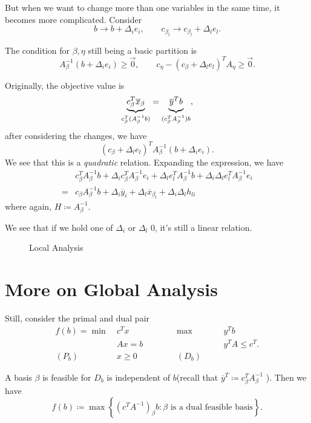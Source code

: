 But when we want to change more than one variables in the same time, it becomes more complicated. Consider
\[
	b\to b+\Delta_{i}e_{i}, \qquad c_{\beta_l}\to c_{\beta_l} + \Delta_l e_l.
\]

The condition for \(\beta, \eta\) still being a basic partition is
\[
	A_{\beta}^{-1}(b+\Delta_{i}e_{i})\geq \vec{0}, \qquad c_{\eta} - (c_{\beta}+\Delta_l e_l)^{T}A_{\eta}\geq \vec{0}.
\]

Originally, the objective value is
\[
	\underbrace{c_{\beta}^{T} \overline{x}_{\beta}}_{c_{\beta}^{T}(A^{-1}_{\beta}b)} = \underbrace{\vphantom{c_{\beta}^{T}}\overline{y}^{T}b}_{(c_{\beta}^{T}A^{-1}_{\beta})b},
\]
after considering the changes, we have
\[
	(c_{\beta}+\Delta_l e_l)^{T}A^{-1}_{\beta}(b+\Delta_{i}e_{i}).
\]
We see that this is a \emph{quadratic} relation. Expanding the expression, we have
\[
	\begin{split}
		&c_{\beta}^{T}A^{-1}_{\beta}b + \Delta_{i}c_{\beta}^{T}A^{-1}_{\beta}e_{i}+\Delta_{l}e_{l}^{T}A^{-1}_{\beta}b+\Delta_i \Delta_l e_{l}^{T}A^{-1}_{\beta}e_{i}\\
		=& c_{\beta}A^{-1}_{\beta}b+\Delta_{i}\overline{y}_{i}+\Delta_l \overline{x}_{\beta_l}+\Delta_{i}\Delta_l h_{li}
	\end{split}
\]
where again, \(H\coloneqq A^{-1}_{\beta}\).
\begin{remark}
	We see that if we hold one of \(\Delta_i\) or \(\Delta_l\) \(0\), it's still a linear relation.
\end{remark}

\begin{figure}[H]
	\centering
	\caption{Local Analysis}
	\label{fig:local-analysis}
\end{figure}

\section{More on Global Analysis}
Still, consider the primal and dual pair
\[
	\begin{alignedat}{5}
		f(b) = \min~&c^{T}x\qquad\qquad&&\max ~&&y^{T}b\\
		&Ax = b 				&&		&&y^{T}A\leq c^{T}.\\
		(P_b)\quad	&x\geq  0 	&&(D_b)\quad&&
	\end{alignedat}
\]

A basis \(\beta\) is feasible for \(D_b\) is independent of \(b\)(recall that \(\overline{y}^{T}\coloneqq c_{\beta}^{T}A^{-1}_{\beta}\) ). Then we have
\[
	f(b)\coloneqq \max\left\{ (c^{T}A^{-1})_{\beta}b \colon \beta \text{ is a dual feasible basis} \right\} .
\]

